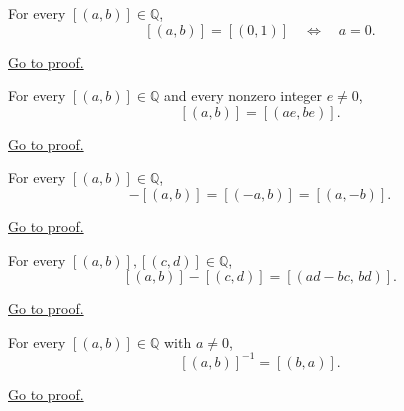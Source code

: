 \begin{theorem}
\label{thm:ec-zero-numerator}
For every $[(a,b)]\in\mathbb{Q}$,
\[
[(a,b)] = [(0,1)]
\quad\Longleftrightarrow\quad
a = 0.
\]
\end{theorem}

\begin{remark*}[Proof]
\hyperref[prf:ec-zero-numerator]{Go to proof.}
\end{remark*}

\begin{theorem}
\label{thm:ec-scaling}
For every $[(a,b)]\in\mathbb{Q}$ and every nonzero integer $e\neq 0$,
\[
[(a,b)] = [(ae,be)].
\]
\end{theorem}

\begin{remark*}[Proof]
\hyperref[prf:ec-scaling]{Go to proof.}
\end{remark*}

\begin{theorem}
\label{thm:ec-negation}
For every $[(a,b)]\in\mathbb{Q}$,
\[
-[(a,b)] = [(-a,b)] = [(a,-b)].
\]
\end{theorem}

\begin{remark*}[Proof]
\hyperref[prf:ec-negation]{Go to proof.}
\end{remark*}

\begin{theorem}
\label{thm:ec-subtraction}
For every $[(a,b)],[(c,d)]\in\mathbb{Q}$,
\[
[(a,b)] - [(c,d)] = [(ad-bc,\,bd)].
\]
\end{theorem}

\begin{remark*}[Proof]
\hyperref[prf:ec-subtraction]{Go to proof.}
\end{remark*}

\begin{theorem}
\label{thm:ec-reciprocal}
For every $[(a,b)]\in\mathbb{Q}$ with $a\neq 0$,
\[
[(a,b)]^{-1} = [(b,a)].
\]
\end{theorem}

\begin{remark*}[Proof]
\hyperref[prf:ec-reciprocal]{Go to proof.}
\end{remark*}
